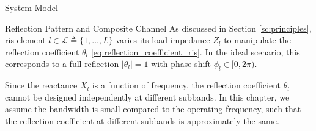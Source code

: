 \begin{section}{System Model}
	\begin{subsection}{Reflection Pattern and Composite Channel}\label{sc:reflection_pattern}
		As discussed in Section \ref{sc:principles}, \gls{ris} element $l \in \mathcal{L} \triangleq \{1, \dots, L\}$ varies its load impedance $Z_l$ to manipulate the reflection coefficient $\theta_l$ \eqref{eq:reflection_coefficient_ris}.
		In the ideal scenario, this corresponds to a full reflection $\lvert \theta_l \rvert = 1$ with phase shift $\phi_l \in [0,2\pi)$.



		\begin{remark}\label{rm:reflection_coefficient}
			Since the reactance $X_l$ is a function of frequency, the reflection coefficient $\theta_l$ cannot be designed independently at different subbands. In this chapter, we assume the bandwidth is small compared to the operating frequency, such that the reflection coefficient at different subbands is approximately the same.
		\end{remark}


\end{subsection}
\end{section}
